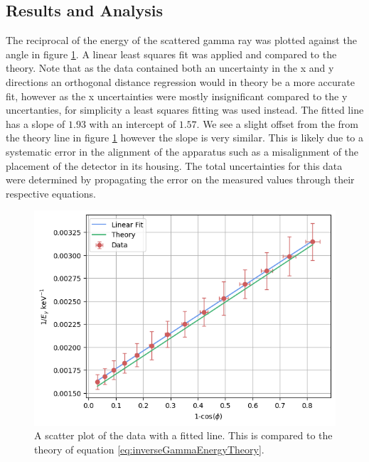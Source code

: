 \documentclass[%
reprint,
amsmath,amssymb,
aps,
floatfix
]{revtex4-2}
\begin{document}
		\subsection{Results and Analysis}
			The reciprocal of the energy of the scattered gamma ray was plotted against the angle in figure \ref{fig:energyPlot}. A linear least squares fit was applied and compared to the theory. Note that as the data contained both an uncertainty in the x and y directions an orthogonal distance regression would in theory be a more accurate fit, however as the x uncertainties were mostly insignificant compared to the y uncertanties, for simplicity a least squares fitting was used instead. The fitted line has a slope of $1.93$ with an intercept of $1.57$. We see a slight offset from the from the theory line in figure \ref{fig:energyPlot} however the slope is very similar. This is likely due to a systematic error in the alignment of the apparatus such as a misalignment of the placement of the detector in its housing. The total uncertainties for this data were determined by propagating the error on the measured values through their respective equations.\\
			
			\begin{figure}
				\includegraphics[width=0.85\columnwidth]{energyPlot.png}
				\caption{\label{fig:energyPlot}A scatter plot of the data with a fitted line. This is compared to the theory of equation \ref{eq:inverseGammaEnergyTheory}.}
			\end{figure}
			
\end{document}
